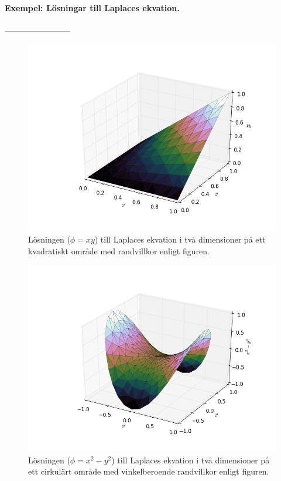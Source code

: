 \documentclass[%
oneside,                 %
final,                   %
10pt]{article}
\begin{document}
\paragraph{Exempel: Lösningar till Laplaces ekvation.}
------------------------


\begin{figure}[h]  %
  \centerline{\includegraphics[width=0.8\linewidth]{fig/xy.png}}
  \caption{
  Lösningen ($\phi = xy$) till Laplaces ekvation i två dimensioner på ett kvadratiskt område med randvillkor enligt figuren. \label{fig:xy}
  }
\end{figure}



\begin{figure}[h]  %
  \centerline{\includegraphics[width=0.8\linewidth]{fig/x2y2.png}}
  \caption{
  Lösningen ($\phi = x^2 - y^2$) till Laplaces ekvation i två dimensioner på ett cirkulärt område med vinkelberoende randvillkor enligt figuren. \label{fig:x2y2}
  }
\end{figure}
\end{document}
